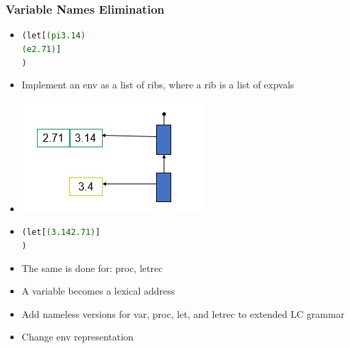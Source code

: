 \documentclass{beamer}
\begin{document}
\begin{frame}[fragile]
\frametitle{Variable Names Elimination}
\begin{scriptsize}
\begin{itemize}
\item<1->
\begin{alltt}
(let [\textcolor{darkgreen}{(pi 3.14)}
	      \textcolor{darkgreen}{(e 2.71)}]
)
\end{alltt}

\item<2-> Implement an env as a list of ribs, where a rib is a list of expvals

\item<3->
\begin{center}
\includegraphics[scale=0.9]{nameless-env.jpg}
\end{center}

\item<4->
\begin{alltt}
(let [\textcolor{darkgreen}{(3.14 2.71)}]
)
\end{alltt}

\item<5-> The same is done for: proc, letrec

\item<5-> A variable becomes a lexical address

\item<5-> Add nameless versions for var, proc, let, and letrec to extended LC grammar

\item<5-> Change env representation

\end{itemize}
\end{scriptsize}
\end{frame}
\end{document}
